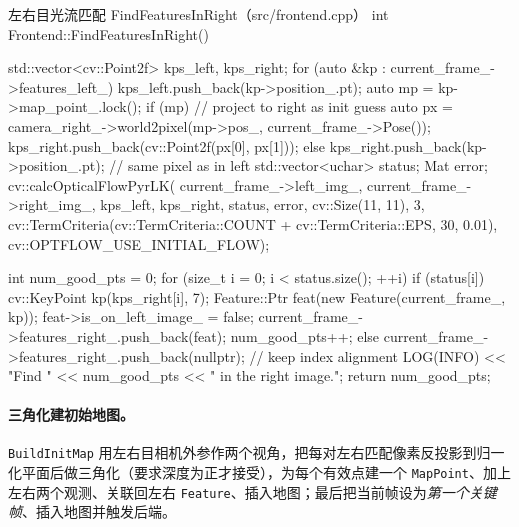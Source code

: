 \begin{codebox}[C++]{左右目光流匹配 FindFeaturesInRight（src/frontend.cpp）}
int Frontend::FindFeaturesInRight() {
    std::vector<cv::Point2f> kps_left, kps_right;
    for (auto &kp : current_frame_->features_left_) {
        kps_left.push_back(kp->position_.pt);
        auto mp = kp->map_point_.lock();
        if (mp) {                                  // project to right as init guess
            auto px = camera_right_->world2pixel(mp->pos_, current_frame_->Pose());
            kps_right.push_back(cv::Point2f(px[0], px[1]));
        } else {
            kps_right.push_back(kp->position_.pt); // same pixel as in left
        }
    }
    std::vector<uchar> status; Mat error;
    cv::calcOpticalFlowPyrLK(
        current_frame_->left_img_, current_frame_->right_img_, kps_left, kps_right,
        status, error, cv::Size(11, 11), 3,
        cv::TermCriteria(cv::TermCriteria::COUNT + cv::TermCriteria::EPS, 30, 0.01),
        cv::OPTFLOW_USE_INITIAL_FLOW);

    int num_good_pts = 0;
    for (size_t i = 0; i < status.size(); ++i) {
        if (status[i]) {
            cv::KeyPoint kp(kps_right[i], 7);
            Feature::Ptr feat(new Feature(current_frame_, kp));
            feat->is_on_left_image_ = false;
            current_frame_->features_right_.push_back(feat);
            num_good_pts++;
        } else {
            current_frame_->features_right_.push_back(nullptr); // keep index alignment
        }
    }
    LOG(INFO) << "Find " << num_good_pts << " in the right image.";
    return num_good_pts;
}
\end{codebox}

\paragraph{三角化建初始地图。}
\texttt{BuildInitMap} 用左右目相机外参作两个视角，把每对左右匹配像素反投影到归一化平面后做三角化（要求深度为正才接受），为每个有效点建一个 \texttt{MapPoint}、加上左右两个观测、关联回左右 \texttt{Feature}、插入地图；最后把当前帧设为\emph{第一个关键帧}、插入地图并触发后端。

